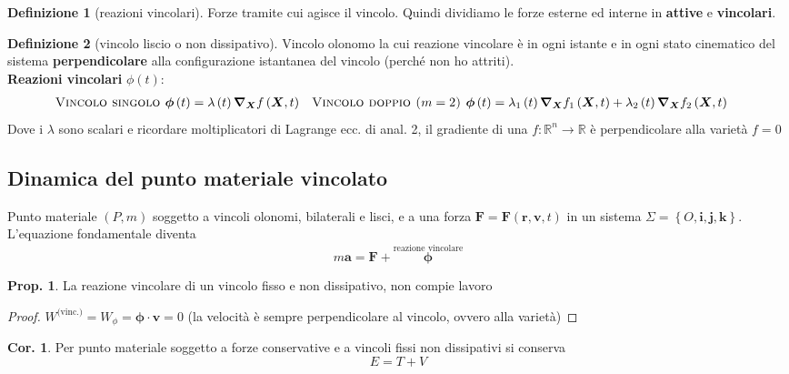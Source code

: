 \documentclass[a4paper,10pt]{article}
\theoremstyle{definition}
\newcommand{\bv}{\boldsymbol} %
\newcommand{\re}{\mathbb{R}} %
\theoremstyle{indentdefinition}
\newtheorem{defn}{Definizione}[section]
\theoremstyle{indenttheorem}
\newtheorem{prop}{Prop.}
\newtheorem{cor}{Cor.}
\theoremstyle{myremark}
\theoremstyle{indentgeneral}
\begin{document}
\begin{defn}[reazioni vincolari]
\label{def:reazioni-vincolari}Forze tramite cui agisce il vincolo. Quindi dividiamo le forze esterne ed interne in \textbf{attive} e \textbf{vincolari}.
\end{defn}

\begin{defn}[vincolo liscio o non dissipativo]
\label{def:vincolo-liscio}Vincolo olonomo la cui reazione vincolare
è in ogni istante e in ogni stato cinematico del sistema \textbf{perpendicolare} alla
configurazione istantanea del vincolo (perché non ho attriti). \\
\textbf{Reazioni vincolari} $\phi(t):$
\begin{align*}
\text{\textsc{Vincolo singolo }} & \boldsymbol{\phi}\left(t\right)=\lambda\left(t\right)\grad_{\bv{X}} f\left(\boldsymbol{X},t\right) & \text{\textsc{Vincolo doppio (\ensuremath{m=2}) }} & \boldsymbol{\phi}\left(t\right)=\lambda_{1}\left(t\right)\grad_{\bv{X}}f_{1}\left(\boldsymbol{X},t\right)+\lambda_{2}\left(t\right)\grad_{\bv{X}} f_{2}\left(\boldsymbol{X},t\right)
\end{align*}
Dove i $\lambda$ sono scalari e ricordare moltiplicatori di Lagrange ecc. di anal. 2, il gradiente di una $f:\re^n\to\re$ è perpendicolare alla varietà $f=0$
\end{defn}


\subsection{Dinamica del punto materiale vincolato}

Punto materiale $\left(P,m\right)$ soggetto a vincoli olonomi, bilaterali
e lisci, e a una forza $\boldsymbol{F}=\boldsymbol{F}\left(\boldsymbol{r},\boldsymbol{v},t\right)$
in un sistema $\Sigma=\left\{ O,\boldsymbol{i},\boldsymbol{j},\boldsymbol{k}\right\} $.
L'equazione fondamentale diventa
\[
m\boldsymbol{a}=\boldsymbol{F}+\boxed{\overset{\text{reazione vincolare}}{\boldsymbol{\phi}}}
\]

\begin{prop}
La reazione vincolare di un vincolo fisso e non dissipativo, non compie
lavoro
\end{prop}

\begin{proof}
$W^{\text{(vinc.)}}=W_{\phi}=\boldsymbol{\phi}\cdot\boldsymbol{v}=0$ (la velocità è sempre perpendicolare al vincolo, ovvero alla varietà)
\end{proof}
\begin{cor}
Per punto materiale soggetto a forze conservative e a vincoli fissi
non dissipativi si conserva
\[
E=T+V
\]
\end{cor}
\end{document}
